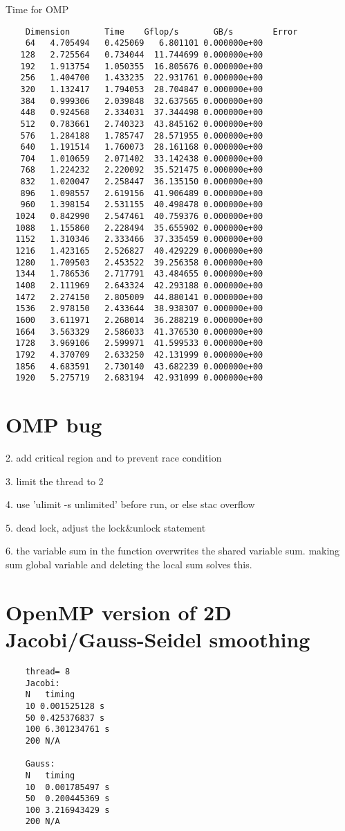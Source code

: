 \documentclass[titlepage]{article}
\begin{document}
Time for OMP
\begin{verbatim}
    Dimension       Time    Gflop/s       GB/s        Error
    64   4.705494   0.425069   6.801101 0.000000e+00
   128   2.725564   0.734044  11.744699 0.000000e+00
   192   1.913754   1.050355  16.805676 0.000000e+00
   256   1.404700   1.433235  22.931761 0.000000e+00
   320   1.132417   1.794053  28.704847 0.000000e+00
   384   0.999306   2.039848  32.637565 0.000000e+00
   448   0.924568   2.334031  37.344498 0.000000e+00
   512   0.783661   2.740323  43.845162 0.000000e+00
   576   1.284188   1.785747  28.571955 0.000000e+00
   640   1.191514   1.760073  28.161168 0.000000e+00
   704   1.010659   2.071402  33.142438 0.000000e+00
   768   1.224232   2.220092  35.521475 0.000000e+00
   832   1.020047   2.258447  36.135150 0.000000e+00
   896   1.098557   2.619156  41.906489 0.000000e+00
   960   1.398154   2.531155  40.498478 0.000000e+00
  1024   0.842990   2.547461  40.759376 0.000000e+00
  1088   1.155860   2.228494  35.655902 0.000000e+00
  1152   1.310346   2.333466  37.335459 0.000000e+00
  1216   1.423165   2.526827  40.429229 0.000000e+00
  1280   1.709503   2.453522  39.256358 0.000000e+00
  1344   1.786536   2.717791  43.484655 0.000000e+00
  1408   2.111969   2.643324  42.293188 0.000000e+00
  1472   2.274150   2.805009  44.880141 0.000000e+00
  1536   2.978150   2.433644  38.938307 0.000000e+00
  1600   3.611971   2.268014  36.288219 0.000000e+00
  1664   3.563329   2.586033  41.376530 0.000000e+00
  1728   3.969106   2.599971  41.599533 0.000000e+00
  1792   4.370709   2.633250  42.131999 0.000000e+00
  1856   4.683591   2.730140  43.682239 0.000000e+00
  1920   5.275719   2.683194  42.931099 0.000000e+00
\end{verbatim}

\section{OMP bug}

2. add critical region and to prevent race condition

3. limit the thread to 2

4. use 'ulimit -s unlimited' before run, or else stac overflow

5. dead lock, adjust the lock\&unlock statement

6. the variable sum in the function overwrites the shared variable sum. making sum global variable and deleting
the local sum solves this.

\section{OpenMP version of 2D Jacobi/Gauss-Seidel smoothing}

\begin{verbatim}
    thread= 8
    Jacobi:
    N   timing         
    10 0.001525128 s    
    50 0.425376837 s
    100 6.301234761 s
    200 N/A
    
    Gauss:
    N   timing
    10  0.001785497 s
    50  0.200445369 s
    100 3.216943429 s
    200 N/A 
\end{verbatim}
\end{document}
